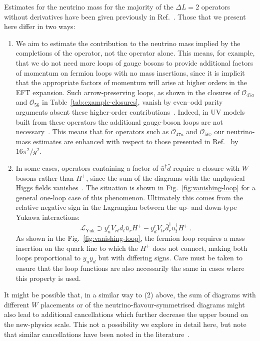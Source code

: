 Estimates for the neutrino mass for the majority of the $\Delta L = 2$ operators
without derivatives have been given previously in Ref.~\cite{deGouvea:2007qla}.
Those that we present here differ in two ways:
\begin{enumerate}
  \item We aim to estimate the contribution to the neutrino mass implied by the
    completions of the operator, not the operator alone. This means, for
    example, that we do not need more loops of gauge bosons to provide
    additional factors of momentum on fermion loops with no mass insertions,
    since it is implicit that the appropriate factors of momentum will arise at
    higher orders in the EFT expansion. Such arrow-preserving loops, as shown in
    the closures of $\mathcal{O}_{47a}$ and $\mathcal{O}_{56}$ in
    Table~\ref{tab:example-closures}, vanish by even--odd parity arguments
    absent these higher-order contributions~\cite{deGouvea:2007qla}. Indeed, in
    UV models built from these operators the additional gauge-boson loops are
    not necessary~\cite{Angel:2012ug, Gargalionis:2019drk}. This means that for
    operators such as $\mathcal{O}_{47a}$ and $\mathcal{O}_{56}$, our
    neutrino-mass estimates are enhanced with respect to those presented in
    Ref.~\cite{deGouvea:2007qla} by $16\pi^{2} / g^{2}$.
  \item In some cases, operators containing a factor of
    $\bar{u}^{\dagger} \bar{d}$ require a closure with $W$ bosons rather than
    $H^{+}$, since the sum of the diagrams with the unphysical Higgs fields
    vanishes~\cite{Babu:2010vp}. The situation is shown in
    Fig.~\ref{fig:vanishing-loop} for a general one-loop case of this
    phenomenon. Ultimately this comes from the relative negative sign in the
    Lagrangian between the up- and down-type Yukawa interactions:
    \begin{equation}
      \label{eq:sm-yukawa-negative}
    \mathscr{L}_{\text{Yuk}} \supset y_{u}^{r} V_{rt} d_{t} \bar{u}_{r} H^{+} - y_{d}^{r} V_{tr} \bar{d}^{\dagger}_{r} u^{\dagger}_{t} H^{+} \ .
  \end{equation}
    As shown in the Fig.~\ref{fig:vanishing-loop}, the fermion loop requires a
    mass insertion on the quark line to which the $H^{+}$ does not connect,
    making both loops proportional to $y_{u} y_{d}$ but with differing signs.
    Care must be taken to ensure that the loop functions are also necessarily
    the same in cases where this property is used.
\end{enumerate}
It might be possible that, in a similar way to (2) above, the sum of diagrams
with different $W$ placements or of the neutrino-flavour-symmetrised diagrams
might also lead to additional cancellations which further decrease the upper
bound on the new-physics scale. This not a possibility we explore in detail
here, but note that similar cancellations have been noted in the
literature~\cite{Gargalionis:2019drk}.

